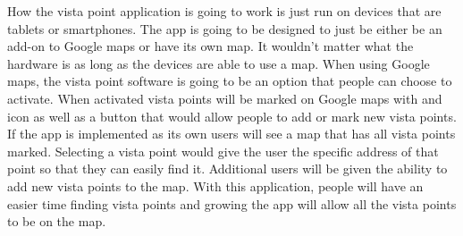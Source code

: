 \documentclass[12pt]{article}
\begin{document}
How the vista point application is going to work is just run on devices that are tablets or smartphones. The app is going to be designed to just be either be an add-on to Google maps or have its own map. It wouldn’t matter what the hardware is as long as the devices are able to use a map. When using Google maps, the vista point software is going to be an option that people can choose to activate. When activated vista points will be marked on Google maps with and icon as well as a button that would allow people to add or mark new vista points.  If the app is implemented as its own users will see a map that has all vista points marked. Selecting a vista point would give the user the specific address of that point so that they can easily find it. Additional users will be given the ability to add new vista points to the map. With this application, people will have an easier time finding vista points and growing the app will allow all the vista points to be on the map.






\end{document}

